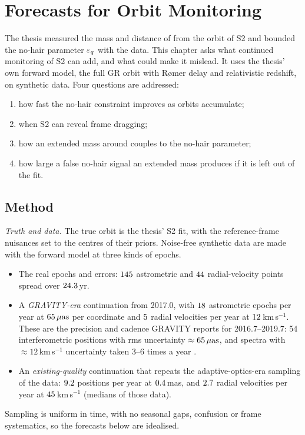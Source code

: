 \chapter{Forecasts for Orbit Monitoring}
\label{ch:xforecast}

The thesis measured the mass and distance of \sgra{} from the orbit of S2 and
bounded the no-hair parameter $\varepsilon_q$ with the \citet{Gillessen2017} data.
This chapter asks what continued monitoring of S2 can add, and what could
make it mislead. It uses the thesis' own forward model, the full GR orbit
with Rømer delay and relativistic redshift, on synthetic data. Four questions
are addressed:
\begin{enumerate}
\item how fast the no-hair constraint improves as orbits accumulate;
\item when S2 can reveal frame dragging;
\item how an extended mass around \sgra{} couples to the no-hair parameter;
\item how large a false no-hair signal an extended mass produces if it is
left out of the fit.
\end{enumerate}

\section{Method}

\emph{Truth and data.} The true orbit is the thesis' S2 fit, with the
reference-frame nuisances set to the centres of their priors. Noise-free
synthetic data are made with the forward model at three kinds of epochs.
\begin{itemize}
\item The real \citet{Gillessen2017} epochs and errors: $145$
astrometric and $44$ radial-velocity points spread over $24.3$\,yr.
\item A \emph{GRAVITY-era} continuation from 2017.0, with $18$
astrometric epochs per year at $65\,\mu\mathrm{as}$ per coordinate and
$5$ radial velocities per year at $12$\,km\,s$^{-1}$.
These are the precision and cadence GRAVITY reports for 2016.7--2019.7: 54
interferometric positions with rms uncertainty $\approx 65\,\mu\mathrm{as}$, and
spectra with $\approx 12$\,km\,s$^{-1}$ uncertainty taken 3--6 times a year
\citep{Gravity2020}.
\item An \emph{existing-quality} continuation that repeats the
adaptive-optics-era sampling of the \citet{Gillessen2017} data: $9.2$
positions per year at $0.4$\,mas, and $2.7$ radial
velocities per year at $45$\,km\,s$^{-1}$ (medians of those data).
\end{itemize}
Sampling is uniform in time, with no seasonal gaps, confusion or frame
systematics, so the forecasts below are idealised.

